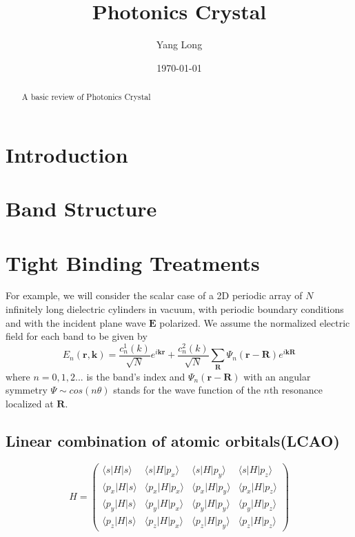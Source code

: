 \documentclass[%
 reprint,
 amsmath,amssymb,
 aps,
rmp,
]{revtex4-1}
\begin{document}

\title{Photonics Crystal}%

\author{Yang Long}

\date{\today}

\begin{abstract}
A basic review of Photonics Crystal
\end{abstract}

\maketitle

\section{Introduction}

\section{Band Structure}

\section{Tight Binding Treatments}
For example, we will consider the scalar case of a 2D periodic array of $N$ infinitely long dielectric cylinders in vacuum, with periodic boundary conditions and with the incident plane wave $\bm{E}$ polarized. We assume the normalized electric field for each band to be given by
\begin{equation}
E_n(\bm{r},\bm{k}) = \frac{c_n^1(k)}{\sqrt{N}}e^{i\bm{k}\bm{r}} + \frac{c_n^2(k)}{\sqrt{N}} \sum_{\bm{R}} \Psi_n(\bm{r}-\bm{R})e^{i\bm{k}\bm{R}}
\end{equation}
where $n=0,1,2...$ is the band's index and $\Psi_n(\bm{r}-\bm{R})$ with an angular symmetry $\Psi \sim cos(n\theta)$ stands for the wave function of the $n$th resonance localized at $\bm{R}$.

\subsection{Linear combination of atomic orbitals(LCAO)}
\begin{equation}
H = \begin{pmatrix}
\langle s|H|s \rangle & \langle s|H|p_x \rangle & \langle s|H|p_y \rangle & \langle s|H|p_z \rangle \\
\langle p_x|H|s \rangle & \langle p_x|H|p_x \rangle & \langle p_x|H|p_y \rangle & \langle p_x|H|p_z \rangle \\
\langle p_y|H|s \rangle & \langle p_y|H|p_x \rangle & \langle p_y|H|p_y \rangle & \langle p_y|H|p_z \rangle  \\
\langle p_z|H|s \rangle & \langle p_z|H|p_x \rangle & \langle p_z|H|p_y \rangle & \langle p_z|H|p_z \rangle 
\end{pmatrix}
\end{equation}
\end{document}

